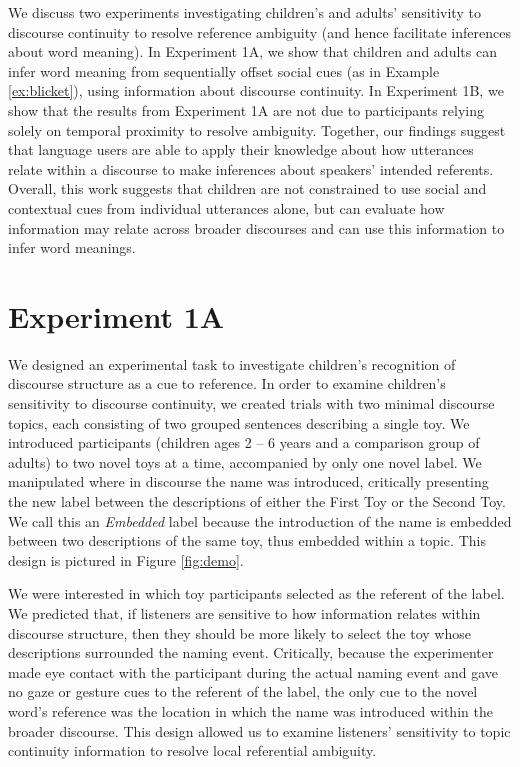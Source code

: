 \documentclass[man]{apa2}
\begin{document}
We discuss two experiments investigating children's and adults' sensitivity to discourse continuity to resolve reference ambiguity (and hence facilitate inferences about word meaning). In Experiment 1A, we show that children and adults can infer word meaning from sequentially offset social cues (as in Example \ref{ex:blicket}), using information about discourse continuity.  In Experiment 1B, we show that the results from Experiment 1A are not due to participants relying solely on temporal proximity to resolve ambiguity.  Together, our findings suggest that language users are able to apply their knowledge about how utterances relate within a discourse to make inferences about speakers' intended referents.  Overall, this work suggests that children are not constrained to use social and contextual cues from individual utterances alone, but can evaluate how information may relate across broader discourses and can use this information to infer word meanings.

\section{Experiment 1A}

We designed an experimental task to investigate children's recognition of discourse structure as a cue to reference. In order to examine children's sensitivity to discourse continuity, we created trials with two minimal discourse topics, each consisting of two grouped sentences describing a single toy.  We introduced participants (children ages 2 -- 6 years and a comparison group of adults) to two novel toys at a time, accompanied by only one novel label.  We manipulated where in discourse the name was introduced, critically presenting the new label between the descriptions of either the First Toy or the Second Toy.  We call this an \emph{Embedded} label because the introduction of the name is embedded between two descriptions of the same toy, thus embedded within a topic.  This design is pictured in Figure \ref{fig:demo}.

We were interested in which toy participants selected as the referent of the label.  We predicted that, if listeners are sensitive to how information relates within discourse structure, then they should be more likely to select the toy whose descriptions surrounded the naming event.  Critically, because the experimenter made eye contact with the participant during the actual naming event and gave no gaze or gesture cues to the referent of the label, the only cue to the novel word's reference was the location in which the name was introduced within the broader discourse.  This design allowed us to examine listeners' sensitivity to topic continuity information to resolve local referential ambiguity.  
\end{document}
